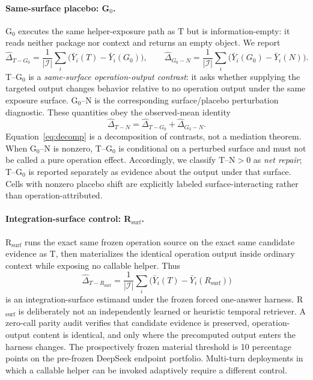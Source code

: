 \paragraph{Same-surface placebo: G$_0$.}
G$_0$ executes the same helper-exposure path as T but is information-empty: it reads neither package nor context and returns an empty object. We report
\begin{equation}
\widehat{\Delta}_{T-G_0}=\frac{1}{|\mathcal I|}\sum_i\bigl(\bar Y_i(T)-\bar Y_i(G_0)\bigr),\qquad
\widehat{\Delta}_{G_0-N}=\frac{1}{|\mathcal I|}\sum_i\bigl(\bar Y_i(G_0)-\bar Y_i(N)\bigr).
\end{equation}
T--G$_0$ is a \emph{same-surface operation-output contrast}: it asks whether supplying the targeted output changes behavior relative to no operation output under the same exposure surface. G$_0$--N is the corresponding surface/placebo perturbation diagnostic. These quantities obey the observed-mean identity
\begin{equation}
\widehat{\Delta}_{T-N}=\widehat{\Delta}_{T-G_0}+\widehat{\Delta}_{G_0-N}.
\label{eq:decomp}
\end{equation}
Equation~\ref{eq:decomp} is a decomposition of contrasts, not a mediation theorem. When G$_0$--N is nonzero, T--G$_0$ is conditional on a perturbed surface and must not be called a pure operation effect. Accordingly, we classify T--N$>0$ as \emph{net repair}; T--G$_0$ is reported separately as evidence about the output under that surface. Cells with nonzero placebo shift are explicitly labeled surface-interacting rather than operation-attributed.

\paragraph{Integration-surface control: R$_{\mathrm{surf}}$.}
R$_{\mathrm{surf}}$ runs the exact same frozen operation source on the exact same candidate evidence as T, then materializes the identical operation output inside ordinary context while exposing no callable helper. Thus
\begin{equation}
\widehat{\Delta}_{T-R_{\mathrm{surf}}}=\frac{1}{|\mathcal I|}\sum_i\bigl(\bar Y_i(T)-\bar Y_i(R_{\mathrm{surf}})\bigr)
\end{equation}
is an integration-surface estimand under the frozen forced one-answer harness. R$_{\mathrm{surf}}$ is deliberately not an independently learned or heuristic temporal retriever. A zero-call parity audit verifies that candidate evidence is preserved, operation-output content is identical, and only where the precomputed output enters the harness changes. The prospectively frozen material threshold is 10 percentage points on the pre-frozen DeepSeek endpoint portfolio. Multi-turn deployments in which a callable helper can be invoked adaptively require a different control.

